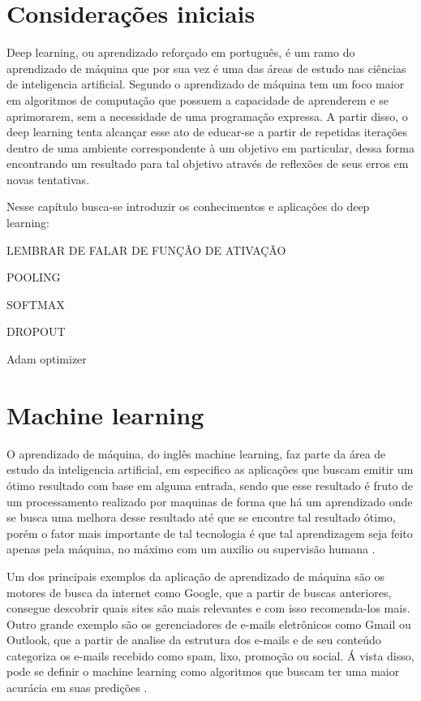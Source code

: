 \section{Considerações iniciais}

Deep learning, ou aprendizado reforçado em português, é um ramo do aprendizado de máquina que por sua vez é uma das áreas de estudo nas ciências de inteligencia artificial. Segundo  o aprendizado de máquina tem um foco maior em algoritmos de computação que possuem a capacidade de aprenderem e se aprimorarem, sem a necessidade de uma programação expressa.
A partir disso, o deep learning tenta alcançar esse ato de educar-se a partir de repetidas iterações dentro de uma ambiente correspondente à um objetivo em particular, dessa forma encontrando um resultado para tal objetivo através de reflexões de seus erros em novas tentativas.

Nesse capítulo busca-se introduzir os conhecimentos e aplicações do deep learning:

LEMBRAR DE FALAR DE FUNÇÃO DE ATIVAÇÃO

POOLING

SOFTMAX

DROPOUT

Adam optimizer

\section{Machine learning}

O aprendizado de máquina, do inglês machine learning, faz parte da área de estudo da inteligencia artificial, em especifico as aplicações que buscam emitir um ótimo resultado com base em alguma entrada, sendo que esse resultado é fruto de um processamento realizado por maquinas de forma que há um aprendizado onde se busca uma melhora desse resultado até que se encontre tal resultado ótimo, porém o fator mais importante de tal tecnologia é que tal aprendizagem seja feito apenas pela máquina, no máximo com um auxilio ou supervisão humana .

Um dos principais exemplos da aplicação de aprendizado de máquina são os motores de busca da internet como Google, que a partir de buscas anteriores, consegue descobrir quais sites são mais relevantes e com isso recomenda-los mais. 
Outro grande exemplo são os gerenciadores de e-mails eletrônicos como Gmail ou Outlook, que a partir de analise da estrutura dos e-mails e de seu conteúdo categoriza os e-mails recebido como spam, lixo, promoção ou social. 
Á vista disso, pode se definir o machine learning como algoritmos que buscam ter uma maior acurácia em suas predições \cite{ed2021}.

